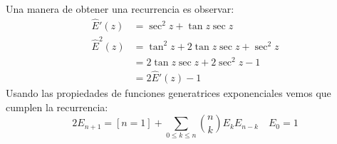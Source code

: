   Una manera de obtener una recurrencia es observar:
  \begin{align*}
    \widehat{E}'(z)
      &= \sec^2 z + \tan z \sec z \\
    \widehat{E}^2(z)
      &= \tan^2 z + 2 \tan z \sec z + \sec^2 z \\
      &= 2 \tan z \sec z + 2 \sec^2 z - 1 \\
      &= 2 \widehat{E}'(z) - 1
  \end{align*}
  Usando las propiedades de funciones generatrices exponenciales%
  vemos que cumplen la recurrencia:
  \begin{equation}
    \label{eq:recurrence-Euler}
    2 E_{n + 1}
      = [n = 1] + \sum_{0 \le k \le n} \binom{n}{k} E_k E_{n - k}
    \quad E_0 = 1
  \end{equation}

